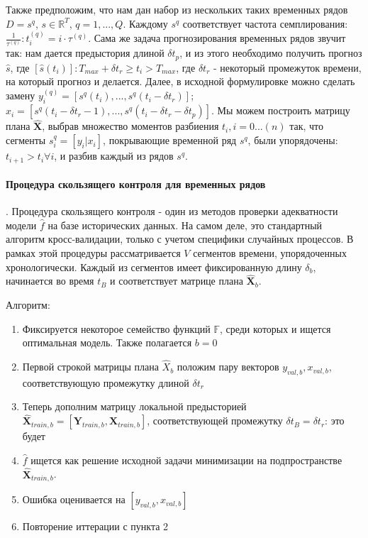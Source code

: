 \documentclass[12pt,twoside]{article}
\begin{document}
Также предположим, что нам дан набор из нескольких таких временных рядов $D = {s^q}$, $s \in \mathbb{R}^T$, $q =1, ..., Q$.
Каждому $s^q$ соответствует частота семплирования:  $\displaystyle \frac{1}{\tau^{(q)}} : t_i^{(q)} = i \cdot  \tau^{(q)}$. Сама же задача прогнозирования временных рядов звучит так: нам дается предыстория длиной $\delta t_p$, и из этого необходимо получить прогноз $\hat{s}$, где $[\hat{s}(t_i)]: T_{max} + \delta t_r \geq  t_i > T_{max}$, где $\delta t_r$ - некоторый промежуток времени, на который прогноз и делается.   Далее, в исходной формулировке можно сделать замену $y_i^{(q)} = [s^q(t_i), ... , s^q(t_i - \delta t_r)]$;
$x_i = [s^q(t_i - \delta t_r - 1), ... , s^q(t_i - \delta t_r - \delta t_p)]$. Мы можем построить матрицу плана $\hat{\mathbf{X}}$, выбрав множество моментов разбиения ${t_i}, i = 0 ... (n) $ так, что сегменты $s_i^q = [y_i| x_i]$, покрывающие временной ряд $s^q$, были упорядочены: $t_{i + 1} > t_i \forall i$, и разбив каждый из рядов ${s^q}$.

\paragraph{Процедура скользящего контроля для временных рядов}.
Процедура скользящего контроля - один из методов проверки адекватности модели $\hat{f}$ на базе исторических данных. На самом деле, это стандартный алгоритм кросс-валидации, только с учетом специфики случайных процессов.
В рамках этой процедуры рассматривается $V$ сегментов времени, упорядоченных хронологически. Каждый из сегментов имеет фиксированную длину $\delta_b$, начинается во время $t_B$ и соответствует матрице плана $\hat{ \mathbf{X}}_b$.

	Алгоритм:
\begin{enumerate}
  \item Фиксируется некоторое семейство функций $\mathbb{F}$, среди которых и ищется оптимальная модель. Также полагается $b = 0$
  \item Первой строкой матрицы плана $\hat{X}_b$ положим пару векторов $y_{val, b}, x_{val, b}$, соответствующую промежутку длиной $\delta t_r$
  \item Теперь дополним матрицу локальной предысторией $\hat{\mathbf{X}}_{train, b} =  [ \mathbf{Y}_{train, b},  \mathbf{X}_{train, b}]$, соответствующей промежутку $\delta t_B = \delta t_r$: это будет 

   \item $\hat{f}$ ищется как решение исходной задачи минимизации на подпространстве $\hat{\mathbf{X}}_{train, b}$.

 \item Ошибка оценивается на $[y_{val, b}, x_{val, b}]$

\item Повторение иттерации с пункта 2
\end{enumerate}
\end{document}
